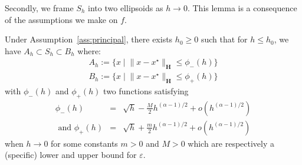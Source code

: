 Secondly, we frame $S_h$ into two ellipsoids as $h\to 0$. This lemma is a consequence of the assumptions we make on $f$.
\begin{lemma}
\label{lemma:sandwich-set}
Under Assumption~\ref{ass:principal}, there exists $h_0\geq 0$ such that for $h\leq h_0$, we have $A_h\subset S_h\subset B_h$ where:
\begin{align*}
A_h:=\{x\mid  \lVert x-x^\star\rVert_{\mathbf{H}}\leq \phi_-(h)\}\\
B_h:=\{x\mid   \lVert x-x^\star\rVert_{\mathbf{H}}\leq \phi_+(h)\}
\end{align*}
with $\phi_-(h)$ and $\phi_+(h)$ two functions satisfying 
\begin{eqnarray*}\phi_-(h)&=&\sqrt{h}-\frac{M}{2}h^{(\alpha-1)/2}+o(h^{(\alpha-1)/2}) \\
\mbox{ and } \phi_+(h)&=&\sqrt{h}+\frac{m}{2}h^{(\alpha-1)/2}+o(h^{(\alpha-1)/2})\end{eqnarray*} when $h\to 0$ for some constants $m>0$ and $M>0$ which are respectively a (specific) lower and upper bound for $\varepsilon$.
\end{lemma}

